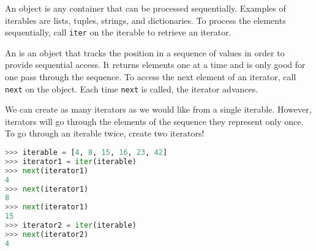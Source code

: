 An  object is any container that can be processed sequentially.
Examples of iterables are lists, tuples, strings, and dictionaries. To process
the elements sequentially, call \texttt{iter} on the iterable to retrieve an
iterator.

An  is an object that tracks the position in a sequence of
values in order to provide sequential access. It returns elements one at a time
and is only good for one pass through the sequence. To access the next element
of an iterator, call \texttt{next} on the object. Each time \texttt{next} is
called, the iterator advances.

We can create as many iterators as we would like from a single iterable. However,
iterators will go through the elements of the sequence they represent only once.
To go through an iterable twice, create two iterators!

\vspace{1em}
\begin{lstlisting}[language=Python]
>>> iterable = [4, 8, 15, 16, 23, 42]
>>> iterator1 = iter(iterable)
>>> next(iterator1)
4
>>> next(iterator1)
8
>>> next(iterator1)
15
>>> iterator2 = iter(iterable)
>>> next(iterator2)
4
\end{lstlisting}
